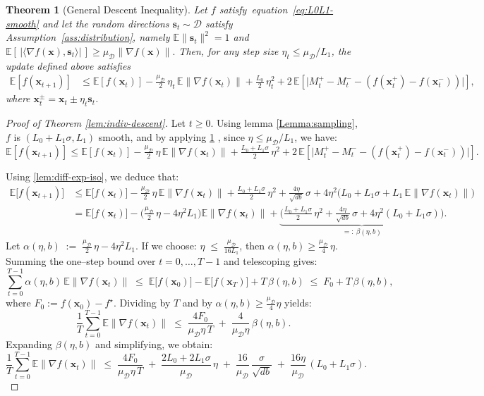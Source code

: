 \documentclass[10pt,a4paper]{amsart}
\newtheorem{theorem}{Theorem}
\newcommand{\E}{\mathbb{E}}
\def\cD{{\mathcal{D}}}
\def\eqref#1{equation~\ref{#1}}
\def\vs{{\bm{s}}}
\def\vx{{\bm{x}}}
\begin{document}
\begin{theorem}[General Descent Inequality]
\label{thm:general-descent}
Let $f$ satisfy~\eqref{eq:L0L1-smooth} and let the random directions
$\vs_t\sim\cD$ satisfy Assumption~\ref{ass:distribution}, namely
\(
    \E\|\vs_t\|^2 = 1
\)
and
\(
    \E[\,|\langle\nabla f(\vx),\vs_t\rangle|\,] \ge \mu_{\cD}\|\nabla f(\vx)\|.
\)
Then, for any step size $\eta_t \le \mu_{\cD}/L_1$,
the update defined above satisfies
\begin{align}
\E[f(\vx_{t+1})]
&\le
\E[f(\vx_t)]
- \tfrac{\mu_{\cD}}{2}\,\eta_t\,\E\|\nabla f(\vx_t)\|
+ \tfrac{L_0}{2}\,\eta_t^2
+ 2\,\E\!\left[
    \big|
        M_t^+ - M_t^- - (f(\vx_t^+) - f(\vx_t^-))
    \big|
\right],
\label{eq:general-descent}
\end{align}
where $\vx_t^\pm = \vx_t \pm \eta_t \vs_t$.
\end{theorem}

\begin{proof}[Proof of Theorem \ref{lem:indiv-descent}]
Let $t\ge 0$. Using lemma \ref{Lemma:sampling},
   $f$ is $(L_0+L_1\sigma,L_1)$ smooth, and by applying \cref{thm:general-descent} , since $\eta\le\mu_\cD/L_1$, we have:
$$
\E[f(\vx_{t+1})]
\le
\E[f(\vx_t)]
- \tfrac{\mu_{\cD}}{2}\,\eta\,\E\|\nabla f(\vx_t)\|
+ \tfrac{L_0+L_1\sigma}{2}\,\eta^2
+ 2\,\E\!\left[
    \big|
        M_t^+ - M_t^- - (f(\vx_t^+) - f(\vx_t^-))
    \big|
\right].    
      $$
      
      
   Using \cref{lem:diff-exp-iso}, we deduce that:
\begin{align*}
\mathbb{E}\big[f(\vx_{t+1})\big]
&\le
\mathbb{E}\big[f(\vx_t)\big]
- \tfrac{\mu_{\mathcal{D}}}{2}\,\eta\,\mathbb{E}\big\|\nabla f(\vx_t)\big\|
+ \tfrac{L_0+L_1\sigma}{2}\,\eta^2
+ \frac{4\eta}{\sqrt{db}}\,\sigma
+ 4\eta^2\Big(L_0+L_1\sigma+L_1\,\mathbb{E}\big\|\nabla f(\vx_t)\big\|\Big)\\
&=
\mathbb{E}\big[f(\vx_t)\big]
-\Big(\tfrac{\mu_{\mathcal{D}}}{2}\,\eta-4\eta^2 L_1\Big)\mathbb{E}\big\|\nabla f(\vx_t)\big\|
+ \underbrace{\Big(\tfrac{L_0+L_1 \sigma}{2}\,\eta^2+\tfrac{4\eta}{\sqrt{db}}\,\sigma+4\eta^2(L_0+L_1\sigma)\Big)}_{=:~\beta(\eta,b)}.
\end{align*}
Let
$
\alpha(\eta,b)\;:=\;\tfrac{\mu_{\mathcal{D}}}{2}\,\eta-4\eta^2 L_1.$
If we choose:
$
\eta \;\le\;\frac{\mu_{\mathcal{D}}}{16L_1}
$,
then $\alpha(\eta,b)\ge \tfrac{\mu_{\mathcal{D}}}{4}\,\eta$. Summing the one–step bound over $t=0,\ldots,T-1$ and telescoping gives:
\[
\sum_{t=0}^{T-1}\alpha(\eta,b)\,\mathbb{E}\big\|\nabla f(\vx_t)\big\|
\;\le\; \mathbb{E}\big[f(\vx_0)\big]-\mathbb{E}\big[f(\vx_T)\big] + T\,\beta(\eta,b)
\;\le\; F_0 + T\,\beta(\eta,b),
\]
where $F_0:=f(\vx_0)-f^\star$. Dividing by $T$ and by $\alpha(\eta,b)\ge \frac{\mu_{\mathcal{D}}}{4}\eta$ yields:
\[
\frac{1}{T}\sum_{t=0}^{T-1}\mathbb{E}\big\|\nabla f(\vx_t)\big\|
\;\le\;
\frac{4F_0}{\mu_{\mathcal{D}}\eta\,T}
\;+\;\frac{4}{\mu_{\mathcal{D}}\eta}\,\beta(\eta,b).
\]
Expanding $\beta(\eta,b)$ and simplifying, we obtain:
\[
\frac{1}{T}\sum_{t=0}^{T-1}\mathbb{E}\big\|\nabla f(\vx_t)\big\|
\;\le\;
\frac{4F_0}{\mu_{\mathcal{D}}\eta\,T}
\;+\;\frac{2L_0+2L_1 \sigma}{\mu_{\mathcal{D}}}\,\eta
\;+\;\frac{16}{\mu_{\mathcal{D}}}\,\frac{\sigma}{\sqrt{db}}
\;+\;\frac{16\eta}{\mu_{\mathcal{D}}}\,(L_0+L_1\sigma).
\]
\end{proof}
\end{document}
